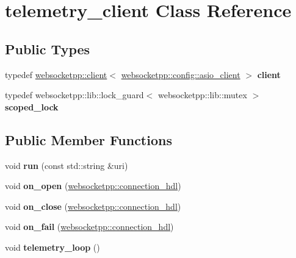 \hypertarget{classtelemetry__client}{}\section{telemetry\+\_\+client Class Reference}
\label{classtelemetry__client}
\subsection*{Public Types}
\begin{DoxyCompactItemize}
\item 
typedef \hyperlink{classwebsocketpp_1_1client}{websocketpp\+::client}$<$ \hyperlink{structwebsocketpp_1_1config_1_1asio__client}{websocketpp\+::config\+::asio\+\_\+client} $>$ {\bfseries client}\hypertarget{classtelemetry__client_a57c0d5f224b12937b76bc6ed9df04d00}{}\label{classtelemetry__client_a57c0d5f224b12937b76bc6ed9df04d00}

\item 
typedef websocketpp\+::lib\+::lock\+\_\+guard$<$ websocketpp\+::lib\+::mutex $>$ {\bfseries scoped\+\_\+lock}\hypertarget{classtelemetry__client_a4ca4c66f8af26fef4940e42c4c7afafe}{}\label{classtelemetry__client_a4ca4c66f8af26fef4940e42c4c7afafe}

\end{DoxyCompactItemize}
\subsection*{Public Member Functions}
\begin{DoxyCompactItemize}
\item 
void {\bfseries run} (const std\+::string \&uri)\hypertarget{classtelemetry__client_aa5765b95b628b04bbe403cf022d0f014}{}\label{classtelemetry__client_aa5765b95b628b04bbe403cf022d0f014}

\item 
void {\bfseries on\+\_\+open} (\hyperlink{namespacewebsocketpp_a6b3d26a10ee7229b84b776786332631d}{websocketpp\+::connection\+\_\+hdl})\hypertarget{classtelemetry__client_a0174e58d0e5417888581372e452a62c2}{}\label{classtelemetry__client_a0174e58d0e5417888581372e452a62c2}

\item 
void {\bfseries on\+\_\+close} (\hyperlink{namespacewebsocketpp_a6b3d26a10ee7229b84b776786332631d}{websocketpp\+::connection\+\_\+hdl})\hypertarget{classtelemetry__client_a0181996f0d5d519c09aee2878ab2b0c3}{}\label{classtelemetry__client_a0181996f0d5d519c09aee2878ab2b0c3}

\item 
void {\bfseries on\+\_\+fail} (\hyperlink{namespacewebsocketpp_a6b3d26a10ee7229b84b776786332631d}{websocketpp\+::connection\+\_\+hdl})\hypertarget{classtelemetry__client_ae63630bbc931ce9d5e7047e65eac19db}{}\label{classtelemetry__client_ae63630bbc931ce9d5e7047e65eac19db}

\item 
void {\bfseries telemetry\+\_\+loop} ()\hypertarget{classtelemetry__client_acc925f9ef40b46fdfb040b9325c67ae2}{}\label{classtelemetry__client_acc925f9ef40b46fdfb040b9325c67ae2}

\end{DoxyCompactItemize}



